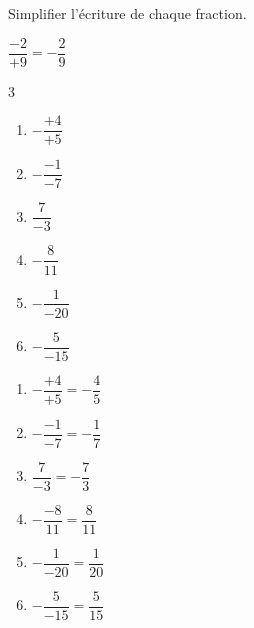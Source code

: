 \begin{exercice*}
    Simplifier l'écriture de chaque fraction.

    \begin{exemple*1}
      $ \dfrac{-2}{+9} = - \dfrac29 $
    \end{exemple*1}

    \begin{multicols}3
      \begin{spacing}{2}
        \begin{enumerate}
          \item $-\dfrac{+4}{+5}$
          \item $-\dfrac{-1}{-7}$
          \item $\dfrac{7}{-3}$
          \item $-\dfrac{8}{11}$
          \item $-\dfrac{1}{-20}$
          \item $-\dfrac{5}{-15}$
        \end{enumerate}              
      \end{spacing}
    \end{multicols}
\end{exercice*}
\begin{corrige}
        \begin{enumerate}
          \item $-\dfrac{+4}{+5} = -\dfrac{4}{5}$
          \item $-\dfrac{-1}{-7} = -\dfrac{1}{7}$
          \item $ \dfrac{7}{-3}  = -\dfrac{7}{3} $
          \item $-\dfrac{-8}{11}  = \dfrac{8}{11} $
          \item $-\dfrac{1}{-20} = \dfrac{1}{20}$
          \item $-\dfrac{5}{-15} = \dfrac{5}{15}$
        \end{enumerate}
\end{corrige}

